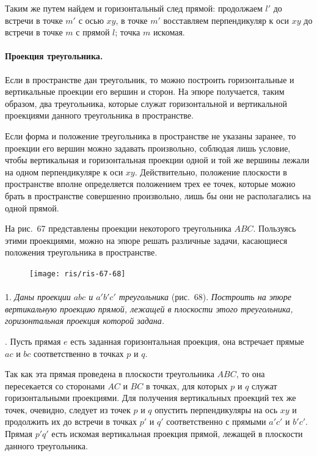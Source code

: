 \documentclass[twoside]{book}
\begin{document}
Таким же путем найдем и горизонтальный след прямой: продолжаем $l'$ до встречи в точке $m'$ с осью $xy$, в точке $m'$ восставляем перпендикуляр к оси $xy$ до встречи в точке $m$ с прямой $l$;
точка $m$ искомая.

\paragraph{Проекция треугольника.}\label{1938/s62}
Если в пространстве дан треугольник, то можно построить горизонтальные и вертикальные проекции его вершин и сторон.
На эпюре получается, таким образом, два треугольника, которые служат горизонтальной и вертикальной проекциями данного треугольника в пространстве.

Если форма и положение треугольника в пространстве не указаны заранее, то проекции его вершин можно задавать произвольно, соблюдая лишь условие, чтобы вертикальная и горизонтальная проекции одной и той же вершины лежали на одном перпендикуляре к оси $xy$.
Действительно, положение плоскости в пространстве вполне определяется положением трех ее точек, которые можно брать в пространстве совершенно произвольно, лишь бы они не располагались на одной прямой.

На рис.~67 представлены проекции некоторого треугольника $ABC$.
Пользуясь этими проекциями, можно на эпюре решать различные задачи, касающиеся положения треугольника в пространстве.

\begin{figure}[h!]
\centering
\texttt{[image: ris/ris-67-68]}
\caption{}
\end{figure}

\paragraph{}\label{1938/s63}
 1.
\emph{Даны проекции $abc$ и $a'b'c'$ треугольника} (рис.~68).
\emph{Построить на эпюре вертикальную проекцию прямой, лежащей в плоскости этого треугольника, горизонтальная проекция которой задана.}

.
Пусть прямая $e$ есть заданная горизонтальная проекция, она встречает прямые $ac$ и $bc$ соответственно в точках $p$ и $q$.

Так как эта прямая проведена в плоскости треугольника $ABC$, то она пересекается со сторонами $AC$ и $BC$ в точках, для которых $p$ и $q$ служат горизонтальными проекциями.
Для получения вертикальных проекций тех же точек, очевидно, следует из точек $p$ и $q$ опустить перпендикуляры на ось $xy$ и продолжить их до встречи в точках $p'$ и $q'$ соответственно с прямыми $a'c'$ и $b'c'$.
Прямая $p'q'$ есть искомая вертикальная проекция прямой, лежащей в плоскости данного треугольника.
\end{document}
